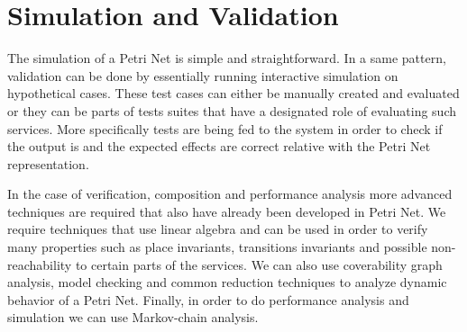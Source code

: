 \section*{Simulation and Validation}

The simulation of a Petri Net is simple and straightforward. In a same pattern, validation can be done by essentially running interactive simulation on hypothetical cases. These test cases can either be manually created and evaluated or they can be parts of tests suites that have a designated role of evaluating such services. More specifically tests are being fed to the system in order to check if the output is and the expected effects are correct relative with the Petri Net representation.

In the case of verification, composition and performance analysis more advanced techniques are required that also have already been developed in Petri Net. We require techniques that use linear algebra and can be used in order to verify many properties such as place invariants, transitions invariants and possible non-reachability to certain parts of the services. We can also use coverability graph analysis, model checking and common reduction techniques to analyze dynamic behavior of a Petri Net. Finally, in order to do performance analysis and simulation we can use Markov-chain analysis.